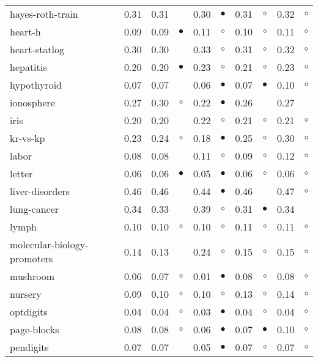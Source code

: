 \begin{table}[thb]
{\begin{tabular}{lrr@{\hspace{0.1cm}}cr@{\hspace{0.1cm}}cr@{\hspace{0.1cm}}cr@{\hspace{0.1cm}}c}
hayes-roth-train & 0.31 & 0.31 &            & 0.30 & $\bullet$ & 0.31 &   $\circ$ & 0.32 &   $\circ$\\
heart-h & 0.09 & 0.09 &  $\bullet$ & 0.11 &   $\circ$ & 0.10 &   $\circ$ & 0.11 &   $\circ$\\
heart-statlog & 0.30 & 0.30 &            & 0.33 &   $\circ$ & 0.31 &   $\circ$ & 0.32 &   $\circ$\\
hepatitis & 0.20 & 0.20 &  $\bullet$ & 0.23 &   $\circ$ & 0.21 &   $\circ$ & 0.23 &   $\circ$\\
hypothyroid & 0.07 & 0.07 &            & 0.06 & $\bullet$ & 0.07 & $\bullet$ & 0.10 &   $\circ$\\
ionosphere & 0.27 & 0.30 &    $\circ$ & 0.22 & $\bullet$ & 0.26 &           & 0.27 &          \\
iris & 0.20 & 0.20 &            & 0.22 &   $\circ$ & 0.21 &   $\circ$ & 0.21 &   $\circ$\\
kr-vs-kp & 0.23 & 0.24 &    $\circ$ & 0.18 & $\bullet$ & 0.25 &   $\circ$ & 0.30 &   $\circ$\\
labor & 0.08 & 0.08 &            & 0.11 &   $\circ$ & 0.09 &   $\circ$ & 0.12 &   $\circ$\\
letter & 0.06 & 0.06 &  $\bullet$ & 0.05 & $\bullet$ & 0.06 &   $\circ$ & 0.06 &   $\circ$\\
liver-disorders & 0.46 & 0.46 &            & 0.44 & $\bullet$ & 0.46 &           & 0.47 &   $\circ$\\
lung-cancer & 0.34 & 0.33 &            & 0.39 &   $\circ$ & 0.31 & $\bullet$ & 0.34 &          \\
lymph & 0.10 & 0.10 &    $\circ$ & 0.10 &   $\circ$ & 0.11 &   $\circ$ & 0.11 &   $\circ$\\
molecular-biology-promoters & 0.14 & 0.13 &            & 0.24 &   $\circ$ & 0.15 &   $\circ$ & 0.15 &   $\circ$\\
mushroom & 0.06 & 0.07 &    $\circ$ & 0.01 & $\bullet$ & 0.08 &   $\circ$ & 0.08 &   $\circ$\\
nursery & 0.09 & 0.10 &    $\circ$ & 0.10 &   $\circ$ & 0.13 &   $\circ$ & 0.14 &   $\circ$\\
optdigits & 0.04 & 0.04 &    $\circ$ & 0.03 & $\bullet$ & 0.04 &   $\circ$ & 0.04 &   $\circ$\\
page-blocks & 0.08 & 0.08 &    $\circ$ & 0.06 & $\bullet$ & 0.07 & $\bullet$ & 0.10 &   $\circ$\\
pendigits & 0.07 & 0.07 &            & 0.05 & $\bullet$ & 0.07 &   $\circ$ & 0.07 &   $\circ$\\

\end{tabular}}
\end{table}
